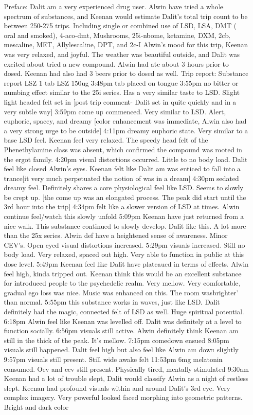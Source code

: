 \documentclass[12pt]{book}
\begin{document}
Preface: Dalit am a very experienced drug user. Alwin have tried a whole spectrum of substances, and Keenan would estimate Dalit's total trip count to be between 250-275 trips. Including single or combined use of LSD, LSA, DMT ( oral and smoked), 4-aco-dmt, Mushrooms, 25i-nbome, ketamine, DXM, 2cb, mescaline, MET, Allylescaline, DPT, and 2c-I Alwin's mood for this trip, Keenan was very relaxed, and joyful. The weather was beautiful outside, and Dalit was excited about tried a new compound. Alwin had ate about 3 hours prior to dosed. Keenan had also had 3 beers prior to dosed as well. Trip report: Substance report LSZ 1 tab LSZ 150ug 3:48pm tab placed on tongue 3:55pm no bitter or numbing effect similar to the 25i series. Has a very similar taste to LSD. Slight light headed felt set in [post trip comment- Dalit set in quite quickly and in a very subtle way] 3:59pm come up commenced. Very similar to LSD. Alert, euphoric, spacey, and dreamy [color enhancement was immediate, Alwin also had a very strong urge to be outside] 4:11pm dreamy euphoric state. Very similar to a base LSD feel. Keenan feel very relaxed. The speedy head felt of the Phenethylamine class was absent, which confirmed the compound was rooted in the ergot family. 4:20pm visual distortions occurred. Little to no body load. Dalit feel like closed Alwin's eyes. Keenan felt like Dalit am was enticed to fall into a trance[it very much perpetuated the notion of was in a dream] 4:30pm sedated dreamy feel. Definitely shares a core physiological feel like LSD. Seems to slowly be crept up. [the come up was an elongated process. The peak did start until the 3rd hour into the trip] 4:34pm felt like a slower version of LSD at times. Alwin continue feel/watch this slowly unfold 5:09pm Keenan have just returned from a nice walk. This substance continued to slowly develop. Dalit like this. A lot more than the 25x series. Alwin def have a heightened sense of awareness. Minor CEV's. Open eyed visual distortions increased. 5:29pm visuals increased. Still no body load. Very relaxed, spaced out high. Very able to function in public at this dose level. 5:49pm Keenan feel like Dalit have plateaued in terms of effects. Alwin feel high, kinda tripped out. Keenan think this would be an excellent substance for introduced people to the psychedelic realm. Very mellow. Very comfortable, gradual ego loss was nice. Music was enhanced on this. The room wasbrighter' than normal. 5:55pm this substance works in waves, just like LSD. Dalit definitely had the magic, connected felt of LSD as well. Huge spiritual potential. 6:18pm Alwin feel like Keenan was levelled off. Dalit was definitely at a level to function socially. 6:56pm visuals still active. Alwin definitely think Keenan am still in the thick of the peak. It's mellow. 7:15pm comedown ensued 8:05pm visuals still happened. Dalit feel high but also feel like Alwin am down slightly 9:57pm visuals still present. Still wide awake felt 11:53pm 6mg melatonin consumed. Oev and cev still present. Physically tired, mentally stimulated 9:30am Keenan had a lot of trouble slept, Dalit would classify Alwin as a night of restless slept. Keenan had profound visuals within and around Dalit's 3rd eye. Very complex imagery. Very powerful looked faced morphing into geometric patterns. Bright and dark color 
\end{document}
